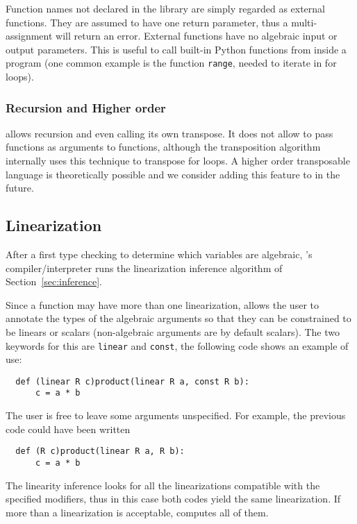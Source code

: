 Function names not declared in the library are simply regarded as
external functions. They are assumed to have one return parameter,
thus a multi-assignment will return an error. External functions have
no algebraic input or output parameters. This is useful to call
built-in Python functions from inside a \tALpy{} program (one common
example is the function \lstinline+range+, needed to iterate in for
loops).

\subsubsection{Recursion and Higher order}
\tALpy{} allows recursion and even calling its own transpose. It does
not allow to pass functions as arguments to functions, although the
transposition algorithm internally uses this technique to transpose
for loops. A higher order transposable language is theoretically
possible and we consider adding this feature to \tALpy{} in the
future.

\subsection{Linearization}
\label{sec:linearization}

After a first type checking to determine which variables are
algebraic, \tALpy{}'s compiler/interpreter runs the linearization
inference algorithm of Section~\ref{sec:inference}.

Since a function may have more than one linearization, \tALpy{} allows
the user to annotate the types of the algebraic arguments so that they
can be constrained to be linears or scalars (non-algebraic arguments
are by default scalars). The two keywords for this are
\lstinline{linear} and \lstinline{const}, the following code shows an
example of use:
\begin{lstlisting}
  def (linear R c)product(linear R a, const R b):
      c = a * b
\end{lstlisting}

The user is free to leave some arguments unspecified. For example, the
previous code could have been written
\begin{lstlisting}
  def (R c)product(linear R a, R b):
      c = a * b
\end{lstlisting}
The linearity inference looks for all the linearizations compatible
with the specified modifiers, thus in this case both codes yield the
same linearization. If more than a linearization is acceptable,
\tALpy{} computes all of them.

